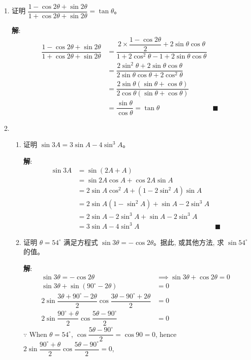 \documentclass{report}
\newcommand{\sol}{\vspace{0.2cm}\textbf{解}:}
\begin{document}
\begin{enumerate}[leftmargin=*]
        \newpage
        \item 证明 $\dfrac{1-\cos 2 \theta+\sin 2 \theta}{1+\cos 2 \theta+\sin 2 \theta}=\tan \theta$。
        
        \sol{}
        \begin{align*}
            \dfrac{1-\cos 2 \theta+\sin 2 \theta}{1+\cos 2 \theta+\sin 2 \theta} &= \dfrac{2 \times \dfrac{1 - \cos 2\theta}{2} + 2\sin\theta\cos\theta}{1 + 2\cos^2\theta - 1 + 2\sin\theta\cos\theta}\\
            &= \dfrac{2\sin^2\theta + 2\sin\theta\cos\theta}{2\sin\theta\cos\theta + 2\cos^2\theta}\\
            &= \dfrac{2\sin\theta(\sin\theta + \cos\theta)}{2\cos\theta(\sin\theta + \cos\theta)}\\
            & = \dfrac{\sin\theta}{\cos\theta} = \tan\theta & \blacksquare
        \end{align*}

        \item \begin{enumerate}[label=(\roman*)]
            \item 证明 $\sin 3A=3 \sin A-4 \sin ^3A$。
            
            \sol{}
            \begin{align*}
                \sin 3A &= \sin(2A + A)\\
                &= \sin 2A \cos A + \cos 2A \sin A\\
                &= 2\sin A \cos^2 A + (1 - 2\sin^2 A)\sin A\\
                &= 2\sin A(1 - \sin^2 A) + \sin A - 2\sin^3 A\\
                &= 2\sin A - 2\sin^3 A + \sin A - 2\sin^3 A\\
                &= 3\sin A - 4\sin^3 A & \blacksquare
            \end{align*}

            \item 证明 $\theta=54^{\circ}$ 满足方程式 $\sin 3 \theta=-\cos 2 \theta$。据此, 或其他方法, 求 $\sin 54^{\circ}$ 的值。
            
            \sol{}
            \begin{align*}
                \sin 3\theta = -\cos 2\theta &\implies \sin 3\theta + \cos 2\theta = 0\\
            \sin 3\theta + \sin \left(90^{\circ} - 2\theta\right) &= 0\\
            2\sin\dfrac{3\theta + 90^{\circ} - 2\theta}{2}\cos\dfrac{3\theta - 90^{\circ} + 2\theta}{2} &= 0\\
            2\sin\dfrac{90^{\circ} + \theta}{2}\cos\dfrac{5\theta - 90^{\circ}}{2} &= 0
            \end{align*}
            $\because$ When $\theta = 54^{\circ}$, $\cos\dfrac{5\theta - 90^{\circ}}{2} = \cos 90 = 0$, hence $2\sin\dfrac{90^{\circ} + \theta}{2}\cos\dfrac{5\theta - 90^{\circ}}{2} = 0$,


\end{enumerate}
\end{enumerate}
\end{document}
